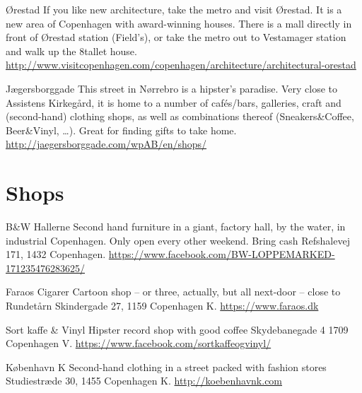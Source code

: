 \begin{funitemshort}
{Ørestad}
{If you like new architecture, take the metro and visit Ørestad. It is a new area of Copenhagen with award-winning houses. There is a mall directly in front of Ørestad station (Field’s), or take the metro out to Vestamager station and walk up the 8tallet house.}
{\url{http://www.visitcopenhagen.com/copenhagen/architecture/architectural-orestad}}
\end{funitemshort}
\begin{funitemshort}
{Jægersborggade}
{This street in Nørrebro is a hipster’s paradise. Very close to Assistens Kirkegård, it is home to a number of cafés/bars, galleries, craft and (second-hand) clothing shops, as well as combinations thereof (Sneakers\&Coffee, Beer\&Vinyl, \dots). Great for finding gifts to take home. }
{\url{http://jaegersborggade.com/wpAB/en/shops/}}
\end{funitemshort}

\section{Shops}

\begin{shopitem}
{B\&W Hallerne}%
{Second hand furniture in a giant, factory hall, by the water, in industrial Copenhagen. Only open every other weekend. Bring cash}%
{Refshalevej 171, 1432 Copenhagen.}%
{\url{https://www.facebook.com/BW-LOPPEMARKED-171235476283625/}}%
\end{shopitem}

\begin{shopitem}
{Faraos Cigarer}%
{Cartoon shop – or three, actually, but all next-door – close to Rundetårn}%
{Skindergade 27, 1159 Copenhagen K.}%
{\url{https://www.faraos.dk}}%
\end{shopitem}

\begin{shopitem}
{Sort kaffe \& Vinyl}%
{Hipster record shop with good coffee}%
{Skydebanegade 4
1709 Copenhagen V.}%
{\url{https://www.facebook.com/sortkaffeogvinyl/}}%
\end{shopitem}

\begin{shopitem}
{København K}%
{Second-hand clothing in a street packed with fashion stores}%
{Studiestræde 30, 1455 Copenhagen K.}%
{\url{http://koebenhavnk.com}}%
\end{shopitem}

